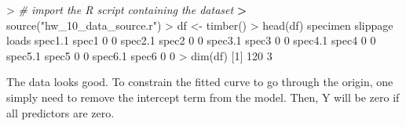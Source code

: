 \documentclass[
]{article}
\newenvironment{Shaded}{\begin{snugshade}}{\end{snugshade}}
\newcommand{\CommentTok}[1]{\textcolor[rgb]{0.56,0.35,0.01}{\textit{#1}}}
\newcommand{\DecValTok}[1]{\textcolor[rgb]{0.00,0.00,0.81}{#1}}
\newcommand{\ErrorTok}[1]{\textcolor[rgb]{0.64,0.00,0.00}{\textbf{#1}}}
\newcommand{\FloatTok}[1]{\textcolor[rgb]{0.00,0.00,0.81}{#1}}
\newcommand{\FunctionTok}[1]{\textcolor[rgb]{0.00,0.00,0.00}{#1}}
\newcommand{\NormalTok}[1]{#1}
\newcommand{\OtherTok}[1]{\textcolor[rgb]{0.56,0.35,0.01}{#1}}
\newcommand{\SpecialCharTok}[1]{\textcolor[rgb]{0.00,0.00,0.00}{#1}}
\newcommand{\StringTok}[1]{\textcolor[rgb]{0.31,0.60,0.02}{#1}}
\begin{document}
\begin{Shaded}
\begin{Highlighting}[]
\SpecialCharTok{\textgreater{}} \CommentTok{\# import the R script containing the dataset}
\ErrorTok{\textgreater{}} \FunctionTok{source}\NormalTok{(}\StringTok{"hw\_10\_data\_source.r"}\NormalTok{)}
\SpecialCharTok{\textgreater{}}\NormalTok{ df }\OtherTok{\textless{}{-}} \FunctionTok{timber}\NormalTok{()}
\SpecialCharTok{\textgreater{}} \FunctionTok{head}\NormalTok{(df)}
\NormalTok{        specimen slippage loads}
\NormalTok{spec1}\FloatTok{.1}\NormalTok{    spec1        }\DecValTok{0}     \DecValTok{0}
\NormalTok{spec2}\FloatTok{.1}\NormalTok{    spec2        }\DecValTok{0}     \DecValTok{0}
\NormalTok{spec3}\FloatTok{.1}\NormalTok{    spec3        }\DecValTok{0}     \DecValTok{0}
\NormalTok{spec4}\FloatTok{.1}\NormalTok{    spec4        }\DecValTok{0}     \DecValTok{0}
\NormalTok{spec5}\FloatTok{.1}\NormalTok{    spec5        }\DecValTok{0}     \DecValTok{0}
\NormalTok{spec6}\FloatTok{.1}\NormalTok{    spec6        }\DecValTok{0}     \DecValTok{0}
\SpecialCharTok{\textgreater{}} \FunctionTok{dim}\NormalTok{(df)}
\NormalTok{[}\DecValTok{1}\NormalTok{] }\DecValTok{120}   \DecValTok{3}
\end{Highlighting}
\end{Shaded}

The data looks good. To constrain the fitted curve to go through the
origin, one simply need to remove the intercept term from the model.
Then, Y will be zero if all predictors are zero.
\end{document}
